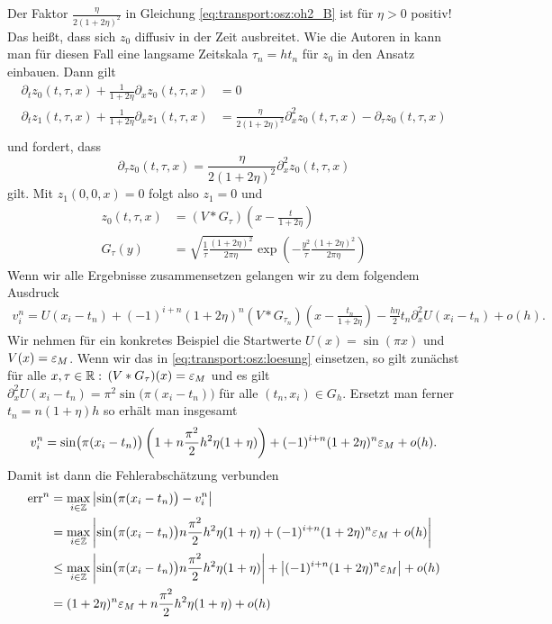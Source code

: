 Der Faktor $\frac{\eta}{2 (1 + 2 \eta)^2}$ in Gleichung \eqref{eq:transport:osz:oh2_B} ist für $\eta > 0$ positiv!
Das heißt, dass sich $z_0$ diffusiv in der Zeit ausbreitet.
Wie die Autoren in \cite{Junk2004} kann man für diesen Fall eine langsame Zeitskala $\tau_n = h t_n$ für $z_0$ in den Ansatz einbauen.
Dann gilt
\begin{align*}
\partial_t z_0(t, \tau, x) + \frac {1} {1 + 2 \eta} \partial_x z_0(t, \tau, x) &= 0\\
\partial_t z_1(t, \tau, x) + \frac {1} {1 + 2 \eta} \partial_x z_1(t, \tau, x) &= \frac{\eta}{2 (1 + 2 \eta)^2} \partial^2_x z_0(t, \tau, x) - \partial_\tau z_0(t, \tau, x)\\
\end{align*}
und fordert, dass
\[ 
\partial_\tau z_0(t, \tau, x) = \frac{\eta}{2 (1 + 2 \eta)^2} \partial^2_x z_0(t, \tau, x) 
\]
gilt. Mit $z_1(0,0,x) = 0$ folgt also $z_1 = 0$ und
\begin{align*}
z_0(t, \tau, x) &= (V * G_\tau)\left(x - \frac{t}{1 + 2 \eta} \right) \\
G_\tau(y) &= \sqrt {\frac{1}{\tau} \frac {(1 + 2 \eta)^2}{2 \pi \eta}} \exp\left( - \frac{y^2}{\tau} \frac {(1 + 2 \eta)^2}{2 \pi \eta} \right)
\end{align*}
Wenn wir alle Ergebnisse zusammensetzen gelangen wir zu dem folgendem Ausdruck
\begin{align}\label{eq:transport:osz:loesung}
v^n_i = U(x_i - t_n) + (-1)^{i+n} (1+ 2 \eta)^n (V * G_{\tau_n})\left(x - \frac{t_n}{1 + 2 \eta} \right) - \frac{h\eta} 2 t_n \partial^2_x U(x_i - t_n) + o(h).
\end{align}
Wir nehmen für ein konkretes Beispiel die Startwerte $U(x) = \sin(\pi x)$ und $V(x) = \varepsilon_M$.
Wenn wir das in \eqref{eq:transport:osz:loesung} einsetzen, so gilt zunächst für alle $x, \tau \in \mathbb R:$ $(V * G_\tau)(x) = \varepsilon_M$ und es gilt $\partial^2_x U(x_i - t_n) = \pi^2 \sin\bigl(\pi (x_i - t_n)\bigr)$ für alle $(t_n, x_i) \in G_h$.
Ersetzt man ferner $t_n = n (1+\eta) h$ so erhält man insgesamt
\begin{align}
v^n_i = \sin\bigl(\pi (x_i - t_n) \bigr)\left( 1 + n \frac {\pi^2} 2 h^2 \eta (1 + \eta) \right)  + (-1)^{i+n} (1 + 2 \eta)^n \varepsilon_M + o(h).
\end{align}
Damit ist dann die Fehlerabschätzung verbunden 
\begin{align}\label{eq:transport:osz:sinus_fehler}
\operatorname{err}^n &= \max_{i \in \mathbb Z} \left| \sin\bigl(\pi (x_i - t_n) \bigr) - v^n_i \right| \nonumber \\
&= \max_{i \in \mathbb Z} \left| \sin\bigl(\pi (x_i - t_n) \bigr) n \frac {\pi^2} 2 h^2 \eta (1 + \eta)  + (-1)^{i+n} (1 + 2 \eta)^n \varepsilon_M + o(h) \right| \nonumber\\
&\leq \max_{i \in \mathbb Z} \left| \sin\bigl(\pi (x_i - t_n) \bigr) n \frac {\pi^2} 2 h^2 \eta (1 + \eta) \right|  + \left| (-1)^{i+n} (1 + 2 \eta)^n \varepsilon_M \right| + o(h) \nonumber\\
&= (1 + 2 \eta)^n \varepsilon_M + n \frac {\pi^2} 2 h^2 \eta (1 + \eta) + o(h)
\end{align}
